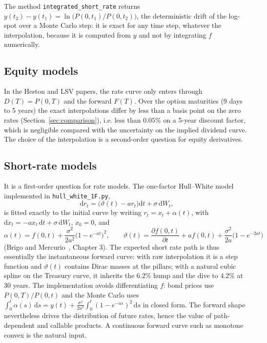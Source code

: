 \documentclass[11pt,a4paper]{article}
\theoremstyle{plain}
\theoremstyle{definition}
\newcommand{\dd}{\mathrm{d}}
\begin{document}
The method \texttt{integrated\_short\_rate} returns $y(t_2)-y(t_1)=\ln\bigl(P(0,t_1)/P(0,t_2)\bigr)$, the deterministic drift of the log-spot over a Monte Carlo step: it is exact for any time step, whatever the interpolation, because it is computed from $y$ and not by integrating $f$ numerically.

\subsection{Equity models}
In the Heston and LSV papers, the rate curve only enters through $D(T)=P(0,T)$ and the forward $F(T)$. Over the option maturities (9 days to 5 years) the exact interpolations differ by less than a basis point on the zero rates (Section~\ref{sec:comparison}), i.e. less than $0.05\%$ on a 5-year discount factor, which is negligible compared with the uncertainty on the implied dividend curve. The choice of the interpolation is a second-order question for equity derivatives.

\subsection{Short-rate models}
It is a first-order question for rate models. The one-factor Hull--White model implemented in \texttt{hull\_white\_1F.py},
\begin{equation}
    \dd r_t=\bigl(\vartheta(t)-ar_t\bigr)\dd t+\sigma\,\dd W_t,
\end{equation}
is fitted exactly to the initial curve by writing $r_t=x_t+\alpha(t)$, with $\dd x_t=-ax_t\,\dd t+\sigma\,\dd W_t$, $x_0=0$, and
\begin{equation}
    \alpha(t)=f(0,t)+\frac{\sigma^2}{2a^2}\bigl(1-e^{-at}\bigr)^2,
    \qquad
    \vartheta(t)=\frac{\partial f(0,t)}{\partial t}+af(0,t)+\frac{\sigma^2}{2a}\bigl(1-e^{-2at}\bigr)
\end{equation}
(Brigo and Mercurio~\cite{brigomercurio}, Chapter 3). The expected short rate path is thus essentially the instantaneous forward curve: with raw interpolation it is a step function and $\vartheta(t)$ contains Dirac masses at the pillars; with a natural cubic spline on the Treasury curve, it inherits the $6.2\%$ hump and the dive to $4.2\%$ at 30 years. The implementation avoids differentiating $f$: bond prices use $P(0,T)/P(0,t)$ and the Monte Carlo uses $\int_0^t\alpha(s)\,\dd s=y(t)+\frac{\sigma^2}{2a^2}\int_0^t(1-e^{-as})^2\,\dd s$ in closed form. The forward shape nevertheless drives the distribution of future rates, hence the value of path-dependent and callable products. A continuous forward curve such as monotone convex is the natural input.
\end{document}
